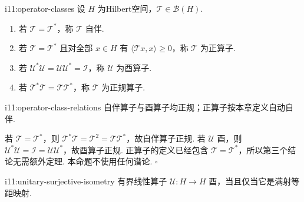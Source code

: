 \begin{FADefinition}[B][四类基本Hilbert算子]{i11:operator-classes}
设 \(\displaystyle H\) 为Hilbert空间，\(\displaystyle \mathcal T\in\mathcal B(H)\).
\begin{enumerate}[label=\textnormal{(\roman*)}]
\item 若 \(\displaystyle \mathcal T=\mathcal T^*\)，称 \(\displaystyle \mathcal T\) 自伴.
\item 若 \(\displaystyle \mathcal T=\mathcal T^*\) 且对全部 \(\displaystyle x\in H\) 有 \(\displaystyle \langle\mathcal T x,x\rangle\geqslant0\)，称 \(\displaystyle \mathcal T\) 为正算子.
\item 若 \(\displaystyle \mathcal U^*\mathcal U=\mathcal U\mathcal U^*=\mathcal I\)，称 \(\displaystyle \mathcal U\) 为酉算子.
\item 若 \(\displaystyle \mathcal T^*\mathcal T=\mathcal T\mathcal T^*\)，称 \(\displaystyle \mathcal T\) 为正规算子.
\end{enumerate}
\end{FADefinition}

\begin{FAProposition}[B][基本包含关系]{i11:operator-class-relations}
自伴算子与酉算子均正规；正算子按本章定义自动自伴.
\end{FAProposition}

\begin{FAProof}
若 \(\displaystyle \mathcal T=\mathcal T^*\)，则 \(\displaystyle \mathcal T^*\mathcal T=\mathcal T^2=\mathcal T\mathcal T^*\)，故自伴算子正规. 若 \(\displaystyle \mathcal U\) 酉，则 \(\displaystyle \mathcal U^*\mathcal U=\mathcal I=\mathcal U\mathcal U^*\)，故酉算子正规. 正算子的定义已经包含 \(\displaystyle \mathcal T=\mathcal T^*\)，所以第三个结论无需额外定理. 本命题不使用任何谱论.
\hfill\(\square\)
\end{FAProof}

\begin{FAProposition}[B][酉算子与满射等距]{i11:unitary-surjective-isometry}
有界线性算子 \(\displaystyle \mathcal U:H\to H\) 酉，当且仅当它是满射等距映射.
\end{FAProposition}

